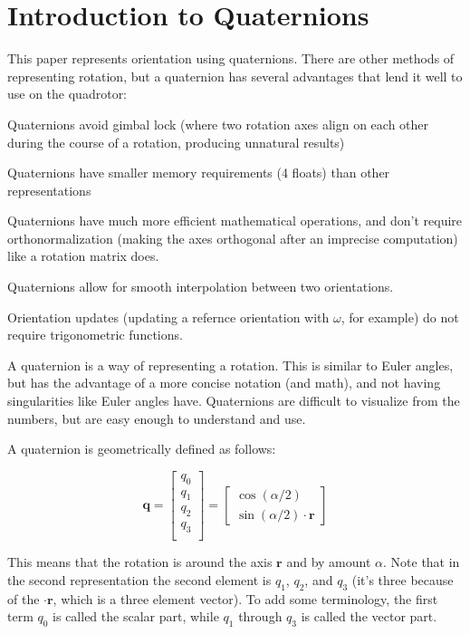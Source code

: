 \documentclass{article}
\numberwithin{equation}{section} %
\begin{document}
\section{Introduction to Quaternions}
This paper represents orientation using quaternions. There are other methods of representing rotation, but a quaternion has several advantages that lend it well to use on the quadrotor:
\begin{list}{*}{}
	\item Quaternions avoid gimbal lock (where two rotation axes align on each other during the course of a rotation, producing unnatural results)
	\item Quaternions have smaller memory requirements (4 floats) than other representations
	\item Quaternions have much more efficient mathematical operations, and don't require orthonormalization (making the axes orthogonal after an imprecise computation) like a rotation matrix does.
	\item Quaternions allow for smooth interpolation between two orientations.
	\item Orientation updates (updating a refernce orientation with $\omega$, for example) do not require trigonometric functions.
\end{list}

A quaternion is a way of representing a rotation. This is similar to Euler angles, but has the advantage of a more concise notation (and math), and not having singularities like Euler angles have. Quaternions are difficult to visualize from the numbers, but are easy enough to understand and use.

A quaternion is geometrically defined as follows:

$$ \boldsymbol{q} = 
	\left[ 
		\begin{array}{c}
			q_0 \\
			q_1 \\
			q_2 \\
			q_3 \\
		\end{array}
	\right]	
	=	
	\left[
		\begin{array}{c}
			\cos \left( \alpha / 2 \right) \\
			\sin \left( \alpha / 2 \right) \cdot \boldsymbol{r}
		\end{array}
	\right]	
$$

This means that the rotation is around the axis $\boldsymbol{r}$ and by amount $\alpha$. Note that in the second representation the second element is $q_1$, $q_2$, and $q_3$ (it's three because of the $\cdot \boldsymbol{r}$, which is a three element vector). To add some terminology, the first term $q_0$ is called the scalar part, while $q_1$ through $q_3$ is called the vector part.
\end{document}
